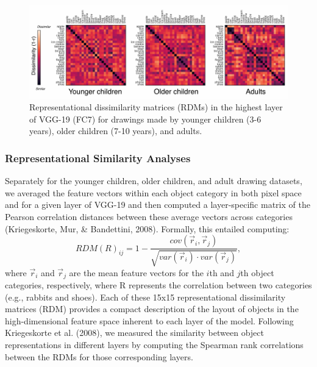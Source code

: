 \documentclass[10pt, letterpaper]{article}
\newenvironment{CodeChunk}{}{}
\begin{document}
\begin{CodeChunk}
\begin{figure}[h]

{\centering \includegraphics[width=1\linewidth]{figs/RSAAllCat-1} 

}

\caption[Representational dissimilarity matrices (RDMs) in the highest layer of VGG-19 (FC7) for drawings made by younger children (3-6 years), older children (7-10 years), and adults]{Representational dissimilarity matrices (RDMs) in the highest layer of VGG-19 (FC7) for drawings made by younger children (3-6 years), older children (7-10 years), and adults.}\label{fig:RSAAllCat}
\end{figure}
\end{CodeChunk}

\subsubsection{Representational Similarity
Analyses}\label{representational-similarity-analyses}

Separately for the younger children, older children, and adult drawing
datasets, we averaged the feature vectors within each object category in
both pixel space and for a given layer of VGG-19 and then computed a
layer-specific matrix of the Pearson correlation distances between these
average vectors across categories (Kriegeskorte, Mur, \& Bandettini,
2008). Formally, this entailed computing:
\[RDM(R)_{ij} = 1- \frac{cov(\vec{r}_{i}, \vec{r}_{j})}{\sqrt{var(\vec{r}_{i}) \cdot var(\vec{r}_{j})}},\]
where \(\vec{r}_{i}\) and \(\vec{r}_{j}\) are the mean feature vectors
for the \(i\)th and \(j\)th object categories, respectively, where R
represents the correlation between two categories (e.g., rabbits and
shoes). Each of these 15x15 representational dissimilarity matrices
(RDM) provides a compact description of the layout of objects in the
high-dimensional feature space inherent to each layer of the model.
Following Kriegeskorte et al. (2008), we measured the similarity between
object representations in different layers by computing the Spearman
rank correlations between the RDMs for those corresponding layers.
\end{document}
